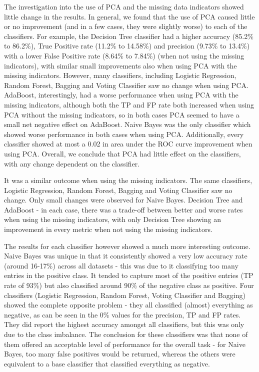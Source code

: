 \documentclass{article}
\begin{document}
The investigation into the use of PCA and the missing data indicators showed little change in the results.
In general, we found that the use of PCA caused little or no improvement (and in a few cases, they were slightly worse) to each of the classifiers.
For example, the Decision Tree classifier had a higher accuracy (85.2\% to 86.2\%), True Positive rate (11.2\% to 14.58\%) and precision (9.73\% to 13.4\%) with a lower False Positive rate (8.64\% to 7.84\%) (when not using the missing indicators), with similar small improvements also when using PCA with the missing indicators.
However, many classifiers, including Logistic Regression, Random Forest, Bagging and Voting Classifier saw no change when using PCA.
AdaBoost, interestingly, had a worse performance when using PCA with the missing indicators, although both the TP and FP rate both increased when using PCA without the missing indicators, so in both cases PCA seemed to have a small net negative effect on AdaBoost.
Naive Bayes was the only classifier which showed worse performance in both cases when using PCA.
Additionally, every classifier showed at most a 0.02 in area under the ROC curve improvement when using PCA.
Overall, we conclude that PCA had little effect on the classifiers, with any change dependent on the classifier.

It was a similar outcome when using the missing indicators.
The same classifiers, Logistic Regression, Random Forest, Bagging and Voting Classifier saw no change.
Only small changes were observed for Naive Bayes. Decision Tree and AdaBoost - in each case, there was a trade-off between better and worse rates when using the missing indicators, with only Decision Tree showing an improvement in every metric when not using the missing indicators.

The results for each classifier however showed a much more interesting outcome.
Naive Bayes was unique in that it consistently showed a very low accuracy rate (around 16-17\%) across all datasets - this was due to it classifying too many entries in the positive class.
It tended to capture most of the positive entries (TP rate of 93\%) but also classified around 90\% of the negative class as positive.
Four classifiers (Logistic Regression, Random Forest, Voting Classifier and Bagging) showed the complete opposite problem - they all classified (almost) everything as negative, as can be seen in the 0\% values for the precision, TP and FP rates.
They did report the highest accuracy amongst all classifiers, but this was only due to the class imbalance.
The conclusion for these classifiers was that none of them offered an acceptable level of performance for the overall task - for Naive Bayes, too many false positives would be returned, whereas the others were equivalent to a base classifier that classified everything as negative.
\end{document}

